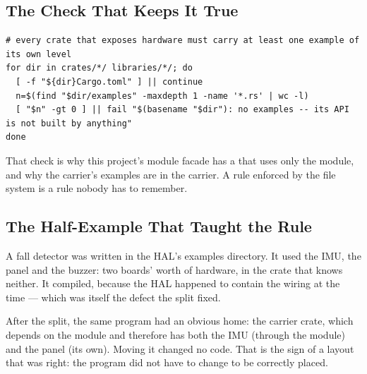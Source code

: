 \subsection{The Check That Keeps It True}

\begin{verbatim}
# every crate that exposes hardware must carry at least one example of its own level
for dir in crates/*/ libraries/*/; do
  [ -f "${dir}Cargo.toml" ] || continue
  n=$(find "$dir/examples" -maxdepth 1 -name '*.rs' | wc -l)
  [ "$n" -gt 0 ] || fail "$(basename "$dir"): no examples -- its API is not built by anything"
done
\end{verbatim}

That check is why this project's module facade has a  that uses only the
module, and why the carrier's examples are in the carrier. A rule enforced by the file system is a rule
nobody has to remember.

\subsection{The Half-Example That Taught the Rule}

A fall detector was written in the HAL's examples directory. It used the IMU, the panel and the buzzer:
two boards' worth of hardware, in the crate that knows neither. It compiled, because the HAL happened to
contain the wiring at the time — which was itself the defect the split fixed.

After the split, the same program had an obvious home: the carrier crate, which depends on the module
and therefore has both the IMU (through the module) and the panel (its own). Moving it changed no code.
That is the sign of a layout that was right: the program did not have to change to be correctly placed.
